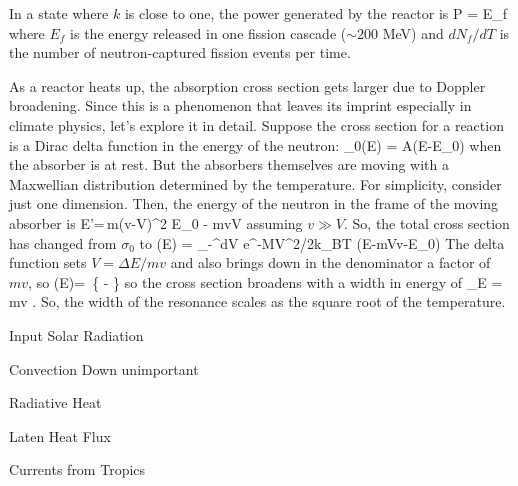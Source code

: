 \documentclass[11pt]{book}
\begin{document}
In a state where $k$ is close to one, the power generated by the reactor is
\be
P = E_f 
\ee
where $E_f$ is the energy released in one fission cascade ($\sim200$ MeV) and $dN_f/dT$ is the number of neutron-captured fission events per time. 


As a reactor heats up, the absorption cross section gets larger due to Doppler broadening. Since this is a phenomenon that leaves its imprint especially in climate physics, let's explore it in detail. Suppose the cross section for a reaction is a Dirac delta function in the energy of the neutron:
\be
\sigma_0(E) = A\delta(E-E_0)
\ee
when the absorber is at rest. But the absorbers themselves are moving with a Maxwellian distribution determined by the temperature. For simplicity, consider just one dimension. Then, the energy of the neutron in the frame of the moving absorber is 
\be
E'=\,m(v-V)^2 \simeq E_0 - mvV
\ee
assuming $v\gg V$. So, the total cross section has changed from
$\sigma_0 $
to
\be
\sigma(E) =  \int_{-\infty}^\infty dV e^{-MV^2/2k_BT} \delta(E-mVv-E_0)
\ee
The delta function sets $V=\Delta E/mv$ and also brings down in the denominator a factor of $mv$, so
\be
\sigma(E)=  \,\exp\left\{ - \right\}
\ee
so the cross section broadens with a width in energy of \be
\sigma_E = mv .\ee
So, the width of the resonance scales as the square root of the temperature.



\bei
\item Input Solar Radiation
\item Convection Down unimportant
\item Radiative Heat
\item Laten Heat Flux
\item Currents from Tropics 
\eei

\end{document}
